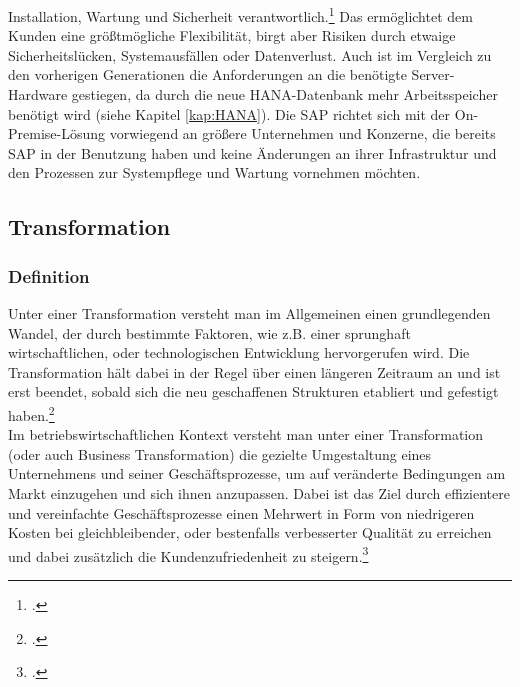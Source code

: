 Installation, Wartung und Sicherheit verantwortlich.\footcite[Vgl.][]{rz10-s4hana} Das ermöglichtet dem Kunden eine größtmögliche Flexibilität, birgt aber Risiken durch etwaige Sicherheitslücken, Systemausfällen oder Datenverlust. Auch ist im Vergleich zu den vorherigen Generationen die Anforderungen an die benötigte Server-Hardware gestiegen, da durch die neue HANA-Datenbank mehr Arbeitsspeicher benötigt wird (siehe Kapitel \ref{kap:HANA}). Die SAP richtet sich mit der On-Premise-Lösung vorwiegend an größere Unternehmen und Konzerne, die bereits SAP in der Benutzung haben und keine Änderungen an ihrer Infrastruktur und den Prozessen zur Systempflege und Wartung vornehmen möchten.  

\subsection{Transformation}
\subsubsection{Definition}
Unter einer Transformation versteht man im Allgemeinen einen grundlegenden Wandel, der durch bestimmte Faktoren, wie z.B. einer sprunghaft wirtschaftlichen, oder technologischen Entwicklung hervorgerufen wird. Die Transformation hält dabei in der Regel über einen längeren Zeitraum an und ist erst beendet, sobald sich die neu geschaffenen Strukturen etabliert und gefestigt haben.\footcite[Vgl.][]{difu}\\ Im betriebswirtschaftlichen Kontext versteht man unter einer Transformation (oder auch Business Transformation) die gezielte Umgestaltung eines Unternehmens und seiner Geschäftsprozesse, um auf veränderte Bedingungen am Markt einzugehen und sich ihnen anzupassen. Dabei ist das Ziel durch effizientere und vereinfachte Geschäftsprozesse einen Mehrwert in Form von niedrigeren Kosten bei gleichbleibender, oder bestenfalls verbesserter Qualität zu erreichen und dabei zusätzlich die Kundenzufriedenheit zu steigern.\footcite[Vgl.][]{leanix}

